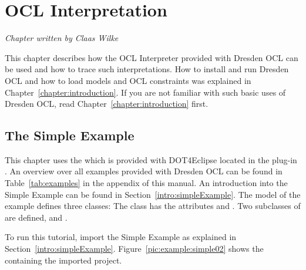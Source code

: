 \chapter{OCL Interpretation}
\label{chapter:interpretation}

\begin{flushright}
\textit{Chapter written by Claas Wilke}
\end{flushright}

This chapter describes how the \acs{OCL} Interpreter provided with Dresden OCL 
can be used and how to trace such interpretations. How to install and run Dresden OCL and how 
to load models and OCL constraints was explained in 
Chapter~\ref{chapter:introduction}. If you are not familiar with such basic uses
of Dresden OCL, read Chapter~\ref{chapter:introduction} first.



\section{The Simple Example}

This chapter uses the  which is provided with 
\acl{DOT4Eclipse} located in the plug-in 
. An overview over
all examples provided with Dresden OCL can be found in 
Table~\ref{tab:examples} in the appendix of this manual. An introduction into
the Simple Example can be found in Section~\ref{intro:simpleExample}. The model 
of the example defines three classes: The class  has the 
attributes  and . Two subclasses of  are 
defined,  and .

To run this tutorial, import the Simple Example as explained in
Section~\ref{intro:simpleExample}. Figure~\ref{pic:example:simple02} shows the
 containing the imported project.

